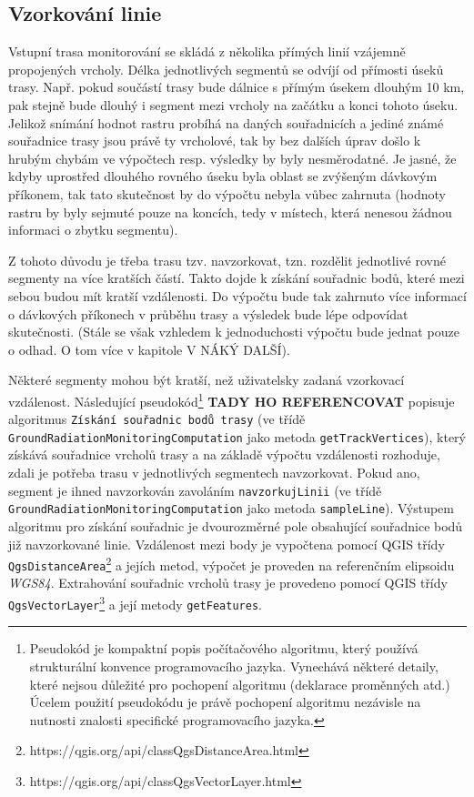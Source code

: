 \subsection{Vzorkování linie}
\label{subsec:vzorkovaniLinie}
Vstupní trasa monitorování se skládá z několika přímých linií vzájemně propojených vrcholy. Délka jednotlivých segmentů se odvíjí od přímosti úseků trasy. Např. pokud součástí trasy bude dálnice s přímým úsekem dlouhým 10 km, pak stejně bude dlouhý i segment mezi vrcholy na začátku a konci tohoto úseku. Jelikož snímání hodnot rastru probíhá na daných souřadnicích a jediné známé souřadnice trasy jsou právě ty vrcholové, tak by bez dalších úprav došlo k hrubým chybám ve výpočtech resp. výsledky by byly nesměrodatné. Je jasné, že kdyby uprostřed dlouhého rovného úseku byla oblast se zvýšeným dávkovým příkonem, tak tato skutečnost by do výpočtu nebyla vůbec zahrnuta (hodnoty rastru by byly sejmuté pouze na koncích, tedy v místech, která nenesou žádnou informaci o zbytku segmentu). 

Z tohoto důvodu je třeba trasu tzv. navzorkovat, tzn. rozdělit jednotlivé rovné segmenty na více kratších částí. Takto dojde k získání souřadnic bodů, které mezi sebou budou mít kratší vzdálenosti. Do výpočtu bude tak zahrnuto více informací o dávkových příkonech v průběhu trasy a výsledek bude lépe odpovídat skutečnosti. (Stále se však vzhledem k jednoduchosti výpočtu bude jednat pouze o odhad. O tom více v kapitole V NÁKÝ DALŠÍ). 

Některé segmenty mohou být kratší, než uživatelsky zadaná vzorkovací vzdálenost. Následující pseudokód\footnote{Pseudokód je kompaktní popis počítačového algoritmu, který používá strukturální konvence programovacího jazyka. Vynechává některé detaily, které nejsou důležité pro pochopení algoritmu (deklarace proměnných atd.) Úcelem použití pseudokódu je právě pochopení algoritmu nezávisle na nutnosti znalosti specifické programovacího jazyka.\cite{pseudocode}} 
\textbf{TADY HO REFERENCOVAT} popisuje algoritmus \texttt{Získání souřadnic bodů trasy} (ve třídě \texttt{GroundRadiationMonitoringComputation} jako metoda \texttt{getTrackVertices}), který získává souřadnice vrcholů trasy a na základě výpočtu vzdálenosti rozhoduje, zdali je potřeba trasu v jednotlivých segmentech navzorkovat. Pokud ano, segment je ihned navzorkován zavoláním \texttt{navzorkujLinii} (ve třídě \texttt{GroundRadiationMonitoringComputation} jako metoda \texttt{sampleLine}). Výstupem algoritmu pro získání souřadnic je dvourozměrné pole obsahující souřadnice bodů již navzorkované linie. Vzdálenost mezi body je vypočtena pomocí QGIS třídy \texttt{QgsDistanceArea}\footnote{https://qgis.org/api/classQgsDistanceArea.html} a jejích metod, výpočet je proveden na referenčním elipsoidu \textit{WGS84}. Extrahování souřadnic vrcholů trasy je provedeno pomocí QGIS třídy \texttt{QgsVectorLayer}\footnote{https://qgis.org/api/classQgsVectorLayer.html} a její metody \texttt{getFeatures}.

